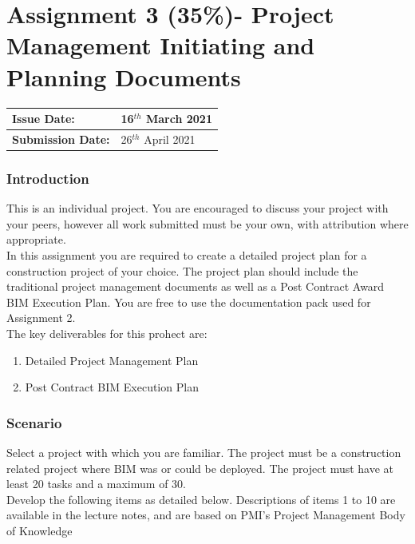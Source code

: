 
	

\part*{Assignment 3 (35\%)- Project Management Initiating and Planning Documents}


\begin{tabularx}{\textwidth}{ |X|X| }
	\hline
	\textbf{Issue Date:} & 16$^{th}$ March 2021\\
	\hline 
	\textbf{Submission Date:}  & 26$^{th}$ April 2021\\
	\hline
\end{tabularx}

\section*{Introduction}

This is an individual project.  You are encouraged to discuss your project with your peers, however all work submitted must be your own, with attribution where appropriate.\\

In this assignment you are required to create a detailed project plan for a construction project of your choice.  The project plan should include the traditional project management documents as well as a Post Contract Award BIM Execution Plan.  You are free to use the documentation pack used for Assignment 2.\\

The key deliverables for this prohect are:

\begin{enumerate}
	\item Detailed Project Management Plan 
	\item Post Contract BIM Execution Plan
\end{enumerate}


\section*{Scenario}

Select a project with which you are familiar. The project must be a construction related project where BIM was or could be deployed.  The project must have at least 20 tasks and a maximum of 30.\\

Develop the following items as detailed below. Descriptions of items 1 to 10 are available in the lecture notes, and are based on PMI's Project Management Body of Knowledge\\

